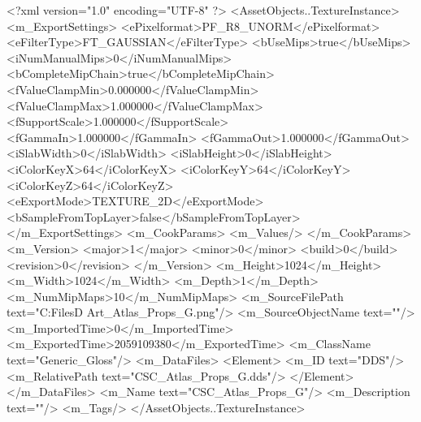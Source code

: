 <?xml version="1.0" encoding="UTF-8" ?>
<AssetObjects..TextureInstance>
	<m_ExportSettings>
		<ePixelformat>PF_R8_UNORM</ePixelformat>
		<eFilterType>FT_GAUSSIAN</eFilterType>
		<bUseMips>true</bUseMips>
		<iNumManualMips>0</iNumManualMips>
		<bCompleteMipChain>true</bCompleteMipChain>
		<fValueClampMin>0.000000</fValueClampMin>
		<fValueClampMax>1.000000</fValueClampMax>
		<fSupportScale>1.000000</fSupportScale>
		<fGammaIn>1.000000</fGammaIn>
		<fGammaOut>1.000000</fGammaOut>
		<iSlabWidth>0</iSlabWidth>
		<iSlabHeight>0</iSlabHeight>
		<iColorKeyX>64</iColorKeyX>
		<iColorKeyY>64</iColorKeyY>
		<iColorKeyZ>64</iColorKeyZ>
		<eExportMode>TEXTURE_2D</eExportMode>
		<bSampleFromTopLayer>false</bSampleFromTopLayer>
	</m_ExportSettings>
	<m_CookParams>
		<m_Values/>
	</m_CookParams>
	<m_Version>
		<major>1</major>
		<minor>0</minor>
		<build>0</build>
		<revision>0</revision>
	</m_Version>
	<m_Height>1024</m_Height>
	<m_Width>1024</m_Width>
	<m_Depth>1</m_Depth>
	<m_NumMipMaps>10</m_NumMipMaps>
	<m_SourceFilePath text="C:\Users\Shadow\Desktop\Working Files\3D Art\Textures\CSC_Atlas_Props_G.png"/>
	<m_SourceObjectName text=""/>
	<m_ImportedTime>0</m_ImportedTime>
	<m_ExportedTime>2059109380</m_ExportedTime>
	<m_ClassName text="Generic_Gloss"/>
	<m_DataFiles>
		<Element>
			<m_ID text="DDS"/>
			<m_RelativePath text="CSC_Atlas_Props_G.dds"/>
		</Element>
	</m_DataFiles>
	<m_Name text="CSC_Atlas_Props_G"/>
	<m_Description text=""/>
	<m_Tags/>
</AssetObjects..TextureInstance>

